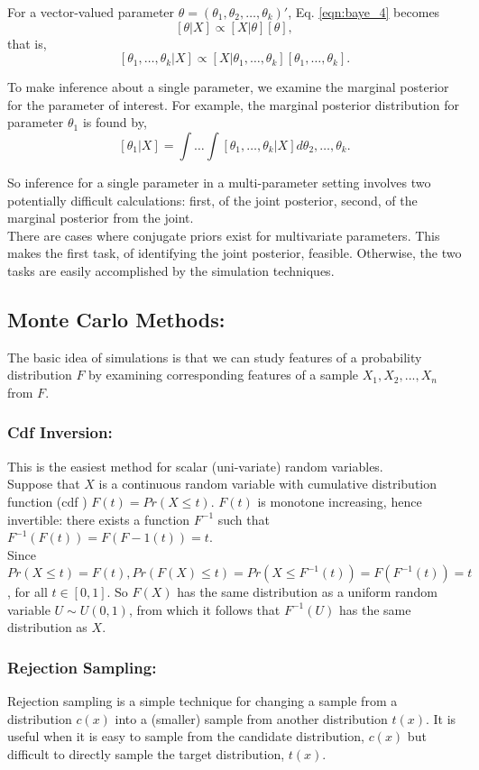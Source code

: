 \documentclass[12pt,oneside,a4paper]{book}
\theoremstyle{definition}
\theoremstyle{remark}
\begin{document}
					For a vector-valued parameter $\theta = (\theta_1,\theta_2,\dots,\theta_k)'$, Eq. \eqref{eqn:baye_4} becomes \[[\theta|X] \propto [X|\theta][\theta],\] that is, \[ [\theta_1,\dots,\theta_k|X] \propto [X|\theta_1,\dots,\theta_k][\theta_1,\dots,\theta_k]. \]

					To make inference about a single parameter, we examine the marginal posterior for the parameter of interest. For example, the marginal posterior distribution for parameter $\theta_1$ is found by, \[ [\theta_1|X] = \int\dots\int [\theta_1,\dots,\theta_k|X]d\theta_2,\dots, \theta_k. \]

					So inference for a single parameter in a multi-parameter setting involves two potentially difficult calculations: first, of the joint posterior, second, of the marginal posterior from the joint.\\

					There are cases where conjugate priors exist for multivariate parameters. This makes the first task, of identifying the joint posterior, feasible. Otherwise, the two tasks are easily accomplished by the simulation techniques.\cite{link2009bayesian}


			\subsection{Monte Carlo Methods:}
				The basic idea of simulations is that we can study features of a probability distribution $F$ 	by examining corresponding features of a sample $X_1, X_2, . . . , X_n$ from $F$.

				\subsubsection{Cdf Inversion:}
					This is the easiest method for scalar (uni-variate) random variables.\\
					Suppose that $X$ is a continuous random variable with cumulative distribution function (cdf ) $F(t) = Pr(X \le t)$.
					$F(t)$ is monotone increasing, hence invertible: there exists a function $F^{-1}$ such that $F^{-1}(F(t)) = F(F-1(t)) = t$.\\
					Since $Pr(X \le t) = F(t), Pr(F(X) \le t) = Pr(X \le F^{-1}(t)) = F(F^{-1}(t)) = t$, for all $t\in [0, 1]$. So $F(X)$ has the same distribution as a uniform random variable $U \sim U(0,1)$, from which it follows that $F^{-1}(U)$ has the same distribution as $X$.

				\subsubsection{Rejection Sampling:}
					Rejection sampling is a simple technique for changing a sample from a distribution $c(x)$ into a (smaller) sample from another distribution $t(x)$. It is useful when it is easy to sample from the candidate distribution, $c(x)$ but difficult to directly sample the target distribution, $t(x)$.
\end{document}
